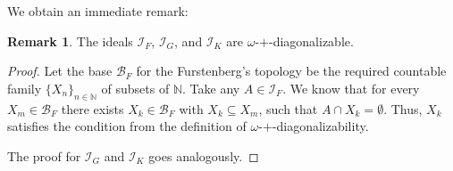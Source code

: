 \documentclass{amsart}
\newtheorem{thm}{Theorem}[section]
\theoremstyle{definition}
\newtheorem{remark}[thm]{Remark}
\theoremstyle{definition}
\newcommand{\N}{{\mathbb N}}
\newcommand{\I}{\mathcal I}
\newcommand{\B}{\mathcal{B}}
\begin{document}

We obtain an immediate remark:
\begin{remark}
The ideals $\I_F$, $\I_G$, and $\I_K$ are $\omega$-$+$-diagonalizable.
\end{remark}

\begin{proof}
Let the base $\B_F$ for the Furstenberg's topology be the required countable family $\{X_n\}_{n\in\N}$ of subsets of $\N$. Take any $A\in \I_F$. We know that for every $X_m \in \B_F$ there exists $X_k \in \B_F$ with $X_k \subseteq X_m$, such that $A\cap X_k = \emptyset$. Thus, $X_k$ satisfies the condition from the definition of $\omega$-$+$-diagonalizability.

The proof for $\I_G$ and $\I_K$ goes analogously.
\end{proof}


%
\end{document}
